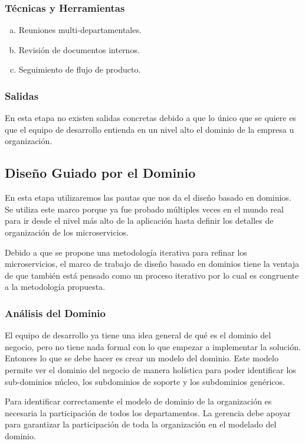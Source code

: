 \subsubsection*{Técnicas y Herramientas}
\begin{enumerate}[a.]
	\item Reuniones multi-departamentales.
	\item Revisión de documentos internos.
	\item Seguimiento de flujo de producto.
\end{enumerate}

\subsubsection*{Salidas}
En esta etapa no existen salidas concretas debido a que lo único que se quiere es que el equipo
de desarrollo entienda en un nivel alto el dominio de la empresa u organización.

\subsection{Diseño Guiado por el Dominio}

En esta etapa utilizaremos las pautas que nos da el diseño basado en dominios.
Se utiliza este marco porque ya fue probado múltiples veces en el mundo real para ir desde
el nivel más alto de la aplicación hasta definir los detalles de organización de los microservicios.

Debido a que se propone una metodología iterativa para refinar los microservicios, el marco de trabajo
de diseño basado en dominios tiene la ventaja de que también está pensado como un proceso iterativo
por lo cual es congruente a la metodología propuesta.

\subsubsection{Análisis del Dominio}

El equipo de desarrollo ya tiene una idea general de qué es el dominio del negocio, pero no tiene
nada formal con lo que empezar a implementar la solución.
Entonces lo que se debe hacer es crear un modelo del dominio.
Este modelo permite ver el dominio del negocio de manera holística para poder identificar
los sub-dominios núcleo, los subdominios de soporte y los subdominios genéricos.

Para identificar correctamente el modelo de dominio de la organización es necesaria la participación
de todos los departamentos.
La gerencia debe apoyar para garantizar la participación de toda la organización en el modelado del dominio.

